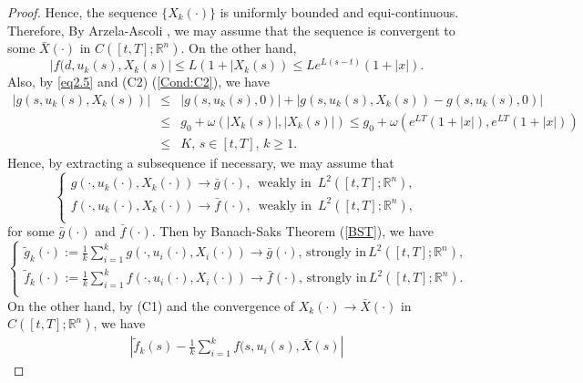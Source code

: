 \begin{proof}
        Hence, the sequence $\{X_k(\cdot)\}$ is uniformly bounded and equi-continuous. 
        Therefore, By Arzela-Ascoli , we may assume that the sequence is 
        convergent to some $\bar{X}(\cdot)$ in $C([t,T];\mathbb{R}^n)$. On the other 
        hand,
        $$
            |f(d,u_k(s),X_k(s)|\leq L(1+|X_k(s))\leq Le^{L(s-t)}(1+|x|).
        $$
        Also, by \cref{eq2.5} and (C2) (\ref{Cond:C2}), we have
        \begin{eqnarray*}
            |g(s,u_k(s),X_k(s))|&\leq& |g(s,u_k(s),0)|+|g(s,u_k(s),X_k(s))-g(s,u_k(s),0)|\\
            &\leq& g_0+ \omega(|X_k(s)|,|X_k(s)|)\leq g_0+\omega(e^{LT}(1+|x|),e^{LT}(1+|x|))\\
            &\leq& K,\,s\in [t,T],\,k\geq 1.
        \end{eqnarray*}
        Hence, by extracting a subsequence if necessary, we may assume that
        $$
            \left\{ 
            \begin{array}{l}
                g(\cdot,u_k(\cdot),X_k(\cdot))\to \bar{g}(\cdot),\,\mbox{ weakly in }\, %
                    L^2([t,T];\mathbb{R}^n), \\
                f(\cdot,u_k(\cdot),X_k(\cdot))\to \bar{f}(\cdot),\,\mbox{ weakly in }\, %
                    L^2([t,T];\mathbb{R}^n),\\
            \end{array}
            \right.
        $$
        for some $\bar{g}(\cdot)$ and $\bar{f}(\cdot)$. Then by Banach-Saks Theorem (\ref{BST}), 
        we have
        \begin{equation}\label{eq2.6}
            \left\{ \begin{array}{l}
                \tilde{g}_k(\cdot):=\frac{1}{k}\sum_{i=1}^{k}g(\cdot,u_i(\cdot),X_i(\cdot))\to \bar{g}(\cdot),\,\mbox{strongly in}\, L^2([t,T];\mathbb{R}^n), \\
                \tilde{f}_k(\cdot):=\frac{1}{k}\sum_{i=1}^{k}f(\cdot,u_i(\cdot),X_i(\cdot))\to \bar{f}(\cdot),\,\mbox{strongly in}\, L^2([t,T];\mathbb{R}^n).\\
                \end{array}
            \right.
        \end{equation}
        On the other hand, by (C1) and the convergence of $X_k(\cdot)\to \bar{X}(\cdot)$ 
        in $C([t,T];\mathbb{R}^n)$, we have
        \begin{eqnarray*}
            |\tilde{f}_k(s)-\frac{1}{k}\sum_{i=1}^{k}f(s,u_i(s),\bar{X}(s)| %

\end{eqnarray*}
\end{proof}
